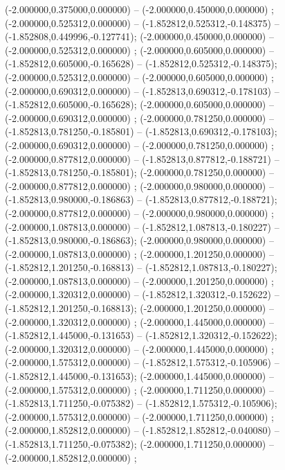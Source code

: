  (-2.000000,0.375000,0.000000) -- (-2.000000,0.450000,0.000000) ;
 (-2.000000,0.525312,0.000000) -- (-1.852812,0.525312,-0.148375) -- (-1.852808,0.449996,-0.127741);
 (-2.000000,0.450000,0.000000) -- (-2.000000,0.525312,0.000000) ;
 (-2.000000,0.605000,0.000000) -- (-1.852812,0.605000,-0.165628) -- (-1.852812,0.525312,-0.148375);
 (-2.000000,0.525312,0.000000) -- (-2.000000,0.605000,0.000000) ;
 (-2.000000,0.690312,0.000000) -- (-1.852813,0.690312,-0.178103) -- (-1.852812,0.605000,-0.165628);
 (-2.000000,0.605000,0.000000) -- (-2.000000,0.690312,0.000000) ;
 (-2.000000,0.781250,0.000000) -- (-1.852813,0.781250,-0.185801) -- (-1.852813,0.690312,-0.178103);
 (-2.000000,0.690312,0.000000) -- (-2.000000,0.781250,0.000000) ;
 (-2.000000,0.877812,0.000000) -- (-1.852813,0.877812,-0.188721) -- (-1.852813,0.781250,-0.185801);
 (-2.000000,0.781250,0.000000) -- (-2.000000,0.877812,0.000000) ;
 (-2.000000,0.980000,0.000000) -- (-1.852813,0.980000,-0.186863) -- (-1.852813,0.877812,-0.188721);
 (-2.000000,0.877812,0.000000) -- (-2.000000,0.980000,0.000000) ;
 (-2.000000,1.087813,0.000000) -- (-1.852812,1.087813,-0.180227) -- (-1.852813,0.980000,-0.186863);
 (-2.000000,0.980000,0.000000) -- (-2.000000,1.087813,0.000000) ;
 (-2.000000,1.201250,0.000000) -- (-1.852812,1.201250,-0.168813) -- (-1.852812,1.087813,-0.180227);
 (-2.000000,1.087813,0.000000) -- (-2.000000,1.201250,0.000000) ;
 (-2.000000,1.320312,0.000000) -- (-1.852812,1.320312,-0.152622) -- (-1.852812,1.201250,-0.168813);
 (-2.000000,1.201250,0.000000) -- (-2.000000,1.320312,0.000000) ;
 (-2.000000,1.445000,0.000000) -- (-1.852812,1.445000,-0.131653) -- (-1.852812,1.320312,-0.152622);
 (-2.000000,1.320312,0.000000) -- (-2.000000,1.445000,0.000000) ;
 (-2.000000,1.575312,0.000000) -- (-1.852812,1.575312,-0.105906) -- (-1.852812,1.445000,-0.131653);
 (-2.000000,1.445000,0.000000) -- (-2.000000,1.575312,0.000000) ;
 (-2.000000,1.711250,0.000000) -- (-1.852813,1.711250,-0.075382) -- (-1.852812,1.575312,-0.105906);
 (-2.000000,1.575312,0.000000) -- (-2.000000,1.711250,0.000000) ;
 (-2.000000,1.852812,0.000000) -- (-1.852812,1.852812,-0.040080) -- (-1.852813,1.711250,-0.075382);
 (-2.000000,1.711250,0.000000) -- (-2.000000,1.852812,0.000000) ;
